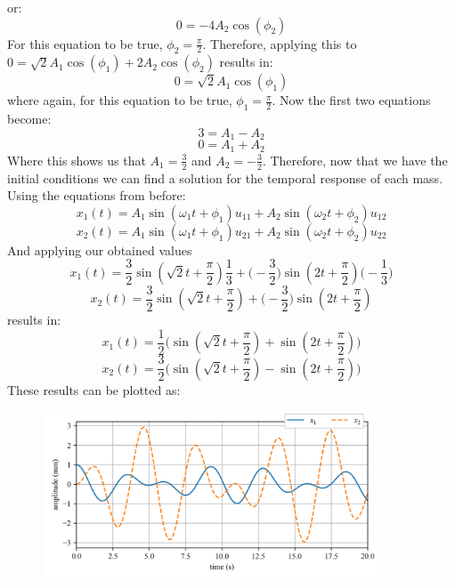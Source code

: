 \documentclass[12pt,letter]{article}
\begin{document}
\begin{example}
	or:
	\begin{equation}
	0= - 4A_2 \cos (\phi_2)
	\end{equation}
	For this equation to be true, $\phi_2=\frac{\pi}{2}$. Therefore, applying this to $0= \sqrt{2}A_1 \cos (\phi_1 ) + 2A_2 \cos (\phi_2)$ results in:
	\begin{equation}
	0= \sqrt{2}A_1 \cos (\phi_1 )
	\end{equation}
	where again, for this equation to be true, $\phi_1=\frac{\pi}{2}$. Now the first two equations become:
	\begin{equation}
	3= A_1 - A_2 
	\end{equation}
	\begin{equation}
	0= A_1 + A_2 
	\end{equation}
	Where this shows us that $A_1 = \frac{3}{2}$ and $A_2 = -\frac{3}{2}$. Therefore, now that we have the initial conditions we can find a solution for the temporal response of each mass. Using the equations from before:
	\begin{equation}
		x_1(t) = A_1 \sin (\omega_1 t + \phi_1 )u_{11} + A_2 \sin (\omega_2 t + \phi_2 )u_{12}
	\end{equation}
	\begin{equation}
		x_2(t) = A_1 \sin (\omega_1 t + \phi_1 )u_{21} + A_2 \sin (\omega_2 t + \phi_2 )u_{22}
	\end{equation}
	And applying our obtained values
	\begin{equation}
		x_1(t) = \frac{3}{2} \sin (\sqrt{2} t + \frac{\pi}{2} )\frac{1}{3} + \bigg(-\frac{3}{2}\bigg) \sin (2 t + \frac{\pi}{2} ) \bigg(-\frac{1}{3}\bigg)
	\end{equation}
	\begin{equation}
		x_2(t) = \frac{3}{2} \sin (\sqrt{2} t + \frac{\pi}{2} ) + \bigg(-\frac{3}{2}\bigg) \sin (2 t + \frac{\pi}{2} )
	\end{equation}
	results in:
	\begin{equation}
		x_1(t) = \frac{1}{2} \bigg(  \sin (\sqrt{2} t + \frac{\pi}{2} ) + \sin (2 t + \frac{\pi}{2} ) \bigg)
	\end{equation}
	\begin{equation}
		x_2(t) = \frac{3}{2}  \bigg( \sin (\sqrt{2} t + \frac{\pi}{2} ) -\sin (2 t + \frac{\pi}{2} ) \bigg)
	\end{equation}
	These results can be plotted as:
	\begin{figure}[H]
		\centering
		\includegraphics[width=0.9\textwidth]{../figures/2-DOF_response.png}

\end{figure}
\end{example}
\end{document}
